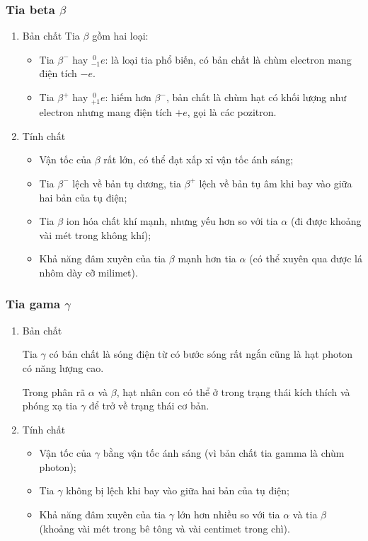 \subsubsection{Tia beta $\beta$}
\begin{enumerate}[label=\alph*)]
	\item Bản chất
	Tia $\beta$ gồm hai loại:
	\begin{itemize}
		\item Tia $\beta^-$ hay $^{\ 0}_{-1}e$: là loại tia phổ biến, có bản chất là chùm electron mang điện tích $-e$.
		\item Tia $\beta^+$ hay $^{\ 0}_{+1}e$: hiếm hơn $\beta^-$, bản chất là chùm hạt có khối lượng như electron nhưng mang điện tích $+e$, gọi là các pozitron.
	\end{itemize}
	
	\item Tính chất
	
	\begin{itemize}
		\item Vận tốc của $\beta$ rất lớn, có thể đạt xấp xỉ vận tốc ánh sáng;
		\item Tia $\beta^-$ lệch về bản tụ dương, tia $\beta^+$ lệch về bản tụ âm khi bay vào giữa hai bản của tụ điện;
		\item Tia $\beta$ ion hóa chất khí mạnh, nhưng yếu hơn so với tia $\alpha$ (đi được khoảng vài mét trong không khí);
		\item Khả năng đâm xuyên của tia $\beta$ mạnh hơn tia $\alpha$ (có thể xuyên qua được lá nhôm dày cỡ milimet).			
	\end{itemize}
\end{enumerate}
\subsubsection{Tia gama $\gamma$}
\begin{enumerate}[label=\alph*)]
	\item Bản chất
	
	Tia $\gamma$ có bản chất là sóng điện từ có bước sóng rất ngắn cũng là hạt photon có năng lượng cao.
	
	Trong phân rã $\alpha$ và $\beta$, hạt nhân con có thể ở trong trạng thái kích thích và phóng xạ tia $\gamma$ để trở về trạng thái cơ bản.
	
	\item Tính chất
	\begin{itemize}
		\item Vận tốc của $\gamma$ bằng vận tốc ánh sáng (vì bản chất tia gamma là chùm photon);
		\item Tia $\gamma$ không bị lệch khi bay vào giữa hai bản của tụ điện;
		\item Khả năng đâm xuyên của tia $\gamma$ lớn hơn nhiều so với tia $\alpha$ và tia $\beta$ (khoảng vài mét trong bê tông và vài centimet trong chì).
	\end{itemize}
	
\end{enumerate}		
